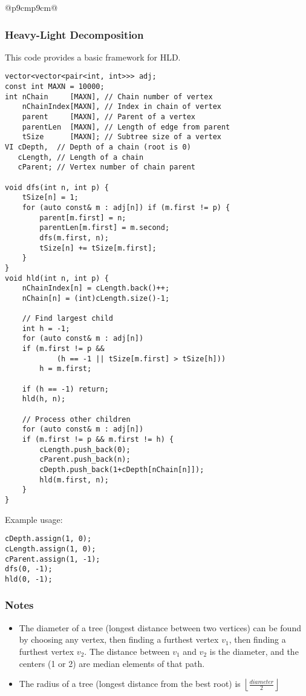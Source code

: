 \documentclass[letterpaper]{article}
\begin{document}
\begin{tabular}{@{}p{9cm}p{9cm}@{}}
    \subsubsection{Heavy-Light Decomposition}

    This code provides a basic framework for HLD.

    \begin{lstlisting}
vector<vector<pair<int, int>>> adj;
const int MAXN = 10000;
int nChain     [MAXN], // Chain number of vertex
    nChainIndex[MAXN], // Index in chain of vertex
    parent     [MAXN], // Parent of a vertex
    parentLen  [MAXN], // Length of edge from parent
    tSize      [MAXN]; // Subtree size of a vertex
VI cDepth,  // Depth of a chain (root is 0)
   cLength, // Length of a chain
   cParent; // Vertex number of chain parent

void dfs(int n, int p) {
	tSize[n] = 1;
	for (auto const& m : adj[n]) if (m.first != p) {
		parent[m.first] = n;
		parentLen[m.first] = m.second;
		dfs(m.first, n);
		tSize[n] += tSize[m.first];
	}
}
void hld(int n, int p) {
	nChainIndex[n] = cLength.back()++;
	nChain[n] = (int)cLength.size()-1;

	// Find largest child
	int h = -1;
	for (auto const& m : adj[n])
	if (m.first != p &&
			(h == -1 || tSize[m.first] > tSize[h]))
		h = m.first;

	if (h == -1) return;
	hld(h, n);

	// Process other children
	for (auto const& m : adj[n])
	if (m.first != p && m.first != h) {
		cLength.push_back(0);
		cParent.push_back(n);
		cDepth.push_back(1+cDepth[nChain[n]]);
		hld(m.first, n);
	}
}
\end{lstlisting}

    Example usage:

    \begin{lstlisting}
cDepth.assign(1, 0);
cLength.assign(1, 0);
cParent.assign(1, -1);
dfs(0, -1);
hld(0, -1);
\end{lstlisting}

    \subsubsection{Notes}

    \begin{itemize}
        \item The diameter of a tree (longest distance between two vertices) can be found by choosing any vertex, then finding a furthest vertex $v_1$, then finding a furthest vertex $v_2$. The distance between $v_1$ and $v_2$ is the diameter, and the centers (1 or 2) are median elements of that path.
        \item The radius of a tree (longest distance from the best root) is $\left\lfloor\frac{diameter}2\right\rfloor$
    \end{itemize}
\end{tabular}
\end{document}
